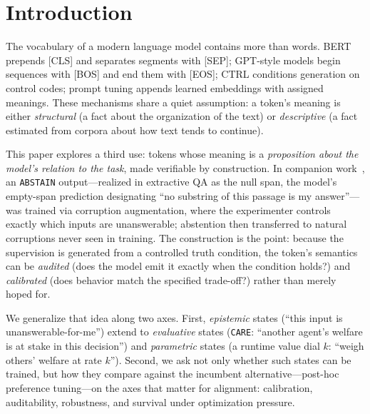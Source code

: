 \documentclass[manuscript, screen, review]{jair}
\newcommand{\care}{\texttt{CARE}}
\newcommand{\abstain}{\texttt{ABSTAIN}}
\begin{document}
\begin{abstract}
\smallskip\noindent
{\bf Conclusions:} Value installation, calibration, runtime control, and
auditability are separable engineering problems. Supervision coverage governs
installation in our setting; an explicit input channel is required for runtime
control; and audit channels must be separated from the conditioning channels
they audit. We claim nothing about phenomenal experience, transfer beyond the
tested bridge, or solved safety problems. Code and all result data are available
at \url{https://github.com/bariskanber/state_tokens}.
\end{abstract}

\maketitle


\section{Introduction}

The vocabulary of a modern language model contains more than words. BERT prepends [CLS] and separates segments with [SEP]; GPT-style models begin sequences with [BOS] and end them with [EOS]; CTRL conditions generation on control codes; prompt tuning appends learned embeddings with assigned meanings. These mechanisms share a quiet assumption: a token's meaning is either \emph{structural} (a fact about the organization of the text) or \emph{descriptive} (a fact estimated from corpora about how text tends to continue).

This paper explores a third use: tokens whose meaning is a \emph{proposition about the model's relation to the task}, made verifiable by construction. In companion work~\citep{kanber2026abstain}, an \abstain{} output---realized in extractive QA as the null span, the model's empty-span prediction designating ``no substring of this passage is my answer''---was trained via corruption augmentation, where the experimenter controls exactly which inputs are unanswerable; abstention then transferred to natural corruptions never seen in training. The construction is the point: because the supervision is generated from a controlled truth condition, the token's semantics can be \emph{audited} (does the model emit it exactly when the condition holds?) and \emph{calibrated} (does behavior match the specified trade-off?) rather than merely hoped for.

We generalize that idea along two axes. First, \emph{epistemic} states (``this input is unanswerable-for-me'') extend to \emph{evaluative} states (\care{}: ``another agent's welfare is at stake in this decision'') and \emph{parametric} states (a runtime value dial $k$: ``weigh others' welfare at rate $k$''). Second, we ask not only whether such states can be trained, but how they compare against the incumbent alternative---post-hoc preference tuning---on the axes that matter for alignment: calibration, auditability, robustness, and survival under optimization pressure.
\end{document}
